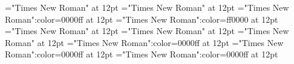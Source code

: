 \documentclass[a4paper]{article}
\begin{document}
 
\pagestyle{plain} 
\sloppy 
\setlength{\parfillskip}{0pt plus 1fil} 
\font\sectionletter="Times New Roman" at 12pt
\font\articlesectionletter="Times New Roman" at 12pt
\font\sensearticlesectionletter="Times New Roman":color=0000ff at 12pt
\font\sensebeforearticlesectionletter="Times New Roman":color=ff0000 at 12pt
\font\firstoftypeheadwordlastoftypesectionletter="Times New Roman" at 12pt
\font\firstoftypelastoftypepronunciationarticlesectionletter="Times New Roman" at 12pt
\font\firstoftypelastoftypestressfirstoftypelastoftypepronunciationarticlesectionletter="Times New Roman" at 12pt
\font\firstoftypegrammarcategorylastoftypesensearticlesectionletter="Times New Roman":color=0000ff at 12pt
\font\exampleusefirstoftypelastoftypesensearticlesectionletter="Times New Roman":color=0000ff at 12pt
\font\examplesensearticlesectionletter="Times New Roman":color=0000ff at 12pt

\pagestyle{fancy} 

\end{document}
